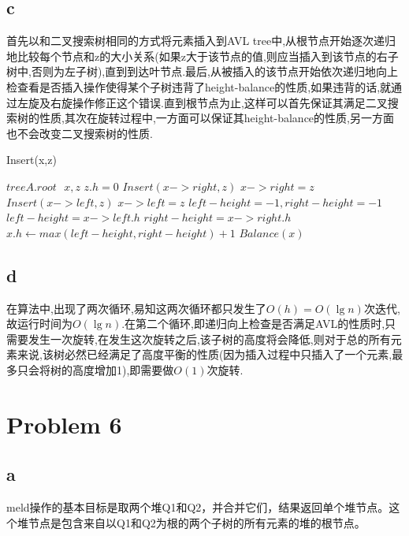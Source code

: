 \documentclass[12pt,a4paper,fontset=none]{ctexart}
\begin{document}
\subsection*{c}
首先以和二叉搜索树相同的方式将元素插入到AVL tree中,从根节点开始逐次递归地比较每个节点和z的大小关系(如果z大于该节点的值,则应当插入到该节点的右子树中,否则为左子树),直到到达叶节点.最后,从被插入的该节点开始依次递归地向上检查看是否插入操作使得某个子树违背了height-balance的性质,如果违背的话,就通过左旋及右旋操作修正这个错误.直到根节点为止,这样可以首先保证其满足二叉搜索树的性质,其次在旋转过程中,一方面可以保证其height-balance的性质,另一方面也不会改变二叉搜索树的性质.
\begin{algorithm}
	\renewcommand{\algorithmicensure}{\textbf{Output:}}
	\renewcommand{\algorithmicrequire}{\textbf{Input:}}
	\caption{Insert(x,z) }
	\label{alg3}
	\begin{algorithmic}
		\Require $tree A.root\text{ }x,z$
		\State $z.h=0$
		\Return
		\EndIf
		\State $Insert(x->right,z)$
		\State $x->right=z$
		\EndIf
		\Else
		\State $Insert(x->left,z)$
		\State $x->left=z$
		\EndIf
		\EndIf
		\State $left-height=-1,right-height=-1$
		\State $left-height=x->left.h$
		\EndIf
		\State $right-height=x->right.h$
		\EndIf
		\State $x.h\gets max(left-height,right-height)+1$
		\State $Balance(x)$
	\end{algorithmic}
\end{algorithm}
\subsection*{d}
在算法中,出现了两次循环,易知这两次循环都只发生了$O(h)=O(\lg n)$次迭代,故运行时间为$O(\lg n)$.在第二个循环,即递归向上检查是否满足AVL的性质时,只需要发生一次旋转,在发生这次旋转之后,该子树的高度将会降低,则对于总的所有元素来说,该树必然已经满足了高度平衡的性质(因为插入过程中只插入了一个元素,最多只会将树的高度增加1),即需要做$O(1)$次旋转.
\section*{Problem 6}
\subsection*{a}
meld操作的基本目标是取两个堆Q1和Q2，并合并它们，结果返回单个堆节点。这个堆节点是包含来自以Q1和Q2为根的两个子树的所有元素的堆的根节点。
\end{document}
